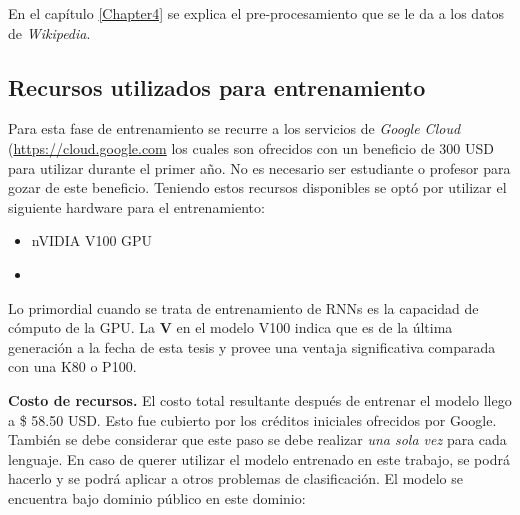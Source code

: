 En el capítulo \ref{Chapter4} se explica el pre-procesamiento que se le da a los datos de \textit{Wikipedia}.

\subsection{Recursos utilizados para entrenamiento}

Para esta fase de entrenamiento se recurre a los servicios de \textit{Google Cloud} (\href{https://cloud.google.com/free}{https://cloud.google.com} los cuales son ofrecidos con un beneficio de 300 USD para utilizar durante el primer año. No es necesario ser estudiante o profesor para gozar de este beneficio. Teniendo estos recursos disponibles se optó por utilizar el siguiente hardware para el entrenamiento:
\begin{itemize}
\item nVIDIA V100 GPU
\item 
\end{itemize}

Lo primordial cuando se trata de entrenamiento de RNNs es la capacidad de cómputo de la GPU. La \textbf{V} en el modelo V100 indica que es de la última generación a la fecha de esta tesis y provee una ventaja significativa comparada con una K80 o P100.

\textbf{Costo de recursos.} El costo total resultante después de entrenar el modelo llego a \$ 58.50 USD. Esto fue cubierto por los créditos iniciales ofrecidos por Google. También se debe considerar que este paso se debe realizar \emph{una sola vez} para cada lenguaje. En caso de querer utilizar el modelo entrenado en este trabajo, se podrá hacerlo y se podrá aplicar a otros problemas de clasificación. El modelo se encuentra bajo dominio público en este dominio:



